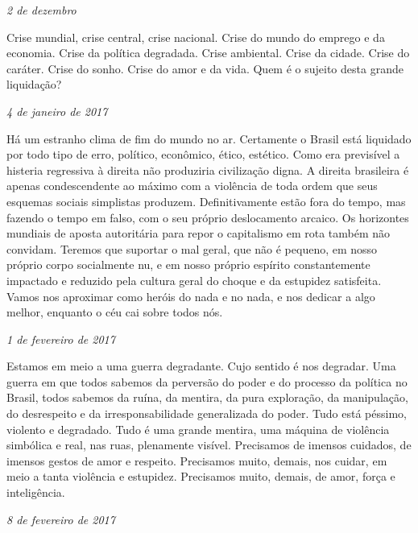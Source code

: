 \begin{flushright}
\emph{2 de dezembro}
\end{flushright}

Crise mundial, crise central, crise nacional. Crise do mundo do emprego
e da economia. Crise da política degradada. Crise ambiental. Crise da
cidade. Crise do caráter. Crise do sonho. Crise do amor e da vida. Quem
é o sujeito desta grande liquidação?

\begin{flushright}
\emph{4 de janeiro de 2017}
\end{flushright}

Há um estranho clima de fim do mundo no ar. Certamente o Brasil está
liquidado por todo tipo de erro, político, econômico, ético, estético.
Como era previsível a histeria regressiva à direita não produziria
civilização digna. A direita brasileira é apenas condescendente ao
máximo com a violência de toda ordem que seus esquemas sociais
simplistas produzem. Definitivamente estão fora do tempo, mas fazendo o
tempo em falso, com o seu próprio deslocamento arcaico. Os horizontes
mundiais de aposta autoritária para repor o capitalismo em rota também
não convidam. Teremos que suportar o mal geral, que não é pequeno, em
nosso próprio corpo socialmente nu, e em nosso próprio espírito
constantemente impactado e reduzido pela cultura geral do choque e da
estupidez satisfeita. Vamos nos aproximar como heróis do nada e no nada,
e nos dedicar a algo melhor, enquanto o céu cai sobre todos nós.

\begin{flushright}
\emph{1 de fevereiro de 2017}
\end{flushright}

Estamos em meio a uma guerra degradante. Cujo sentido é nos degradar.
Uma guerra em que todos sabemos da perversão do poder e do processo da
política no Brasil, todos sabemos da ruína, da mentira, da pura
exploração, da manipulação, do desrespeito e da irresponsabilidade
generalizada do poder. Tudo está péssimo, violento e degradado. Tudo é
uma grande mentira, uma máquina de violência simbólica e real, nas ruas,
plenamente visível. Precisamos de imensos cuidados, de imensos gestos de
amor e respeito. Precisamos muito, demais, nos cuidar, em meio a tanta
violência e estupidez. Precisamos muito, demais, de amor, força e
inteligência.

\begin{flushright}
\emph{8 de fevereiro de 2017}
\end{flushright}

